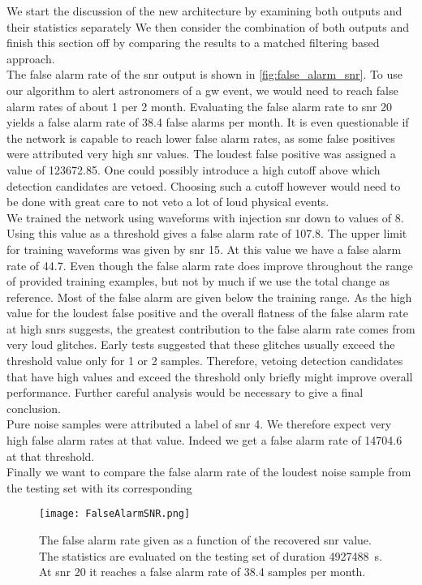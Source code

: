 We start the discussion of the new architecture by examining both outputs and their statistics separately We then consider the combination of both outputs and finish this section off by comparing the results to a matched filtering based approach.\\
The false alarm rate of the \gls{snr} output is shown in \autoref{fig:false_alarm_snr}. To use our algorithm to alert astronomers of a \gls{gw} event, we would need to reach false alarm rates of about 1 per 2 month. Evaluating the false alarm rate to \gls{snr} 20 yields a false alarm rate of 38.4 false alarms per month. It is even questionable if the network is capable to reach lower false alarm rates, as some false positives were attributed very high \gls{snr} values. The loudest false positive was assigned a value of 123672.85. One could possibly introduce a high cutoff above which detection candidates are vetoed. Choosing such a cutoff however would need to be done with great care to not veto a lot of loud physical events.\\
We trained the network using waveforms with injection \gls{snr} down to values of $8$. Using this value as a threshold gives a false alarm rate of 107.8. The upper limit for training waveforms was given by \gls{snr} 15. At this value we have a false alarm rate of 44.7. Even though the false alarm rate does improve throughout the range of provided training examples, but not by much if we use the total change as reference. Most of the false alarm are given below the training range. As the high value for the loudest false positive and the overall flatness of the false alarm rate at high \gls{snr}s suggests, the greatest contribution to the false alarm rate comes from very loud glitches. Early tests suggested that these glitches usually exceed the threshold value only for 1 or 2 samples. Therefore, vetoing detection candidates that have high values and exceed the threshold only briefly might improve overall performance. Further careful analysis would be necessary to give a final conclusion.\\
Pure noise samples were attributed a label of \gls{snr} 4. We therefore expect very high false alarm rates at that value. Indeed we get a false alarm rate of 14704.6 at that threshold.\\
Finally we want to compare the false alarm rate of the loudest noise sample from the testing set with its corresponding
\begin{figure}
\centering
\texttt{[image: FalseAlarmSNR.png]}
\caption[False alarm rate for SNR]{The false alarm rate given as a function of the recovered \gls{snr} value. The statistics are evaluated on the testing set of duration \SI{4927488}{\s}. At \gls{snr} 20 it reaches a false alarm rate of 38.4 samples per month.}\label{fig:false_alarm_snr}
\end{figure}
